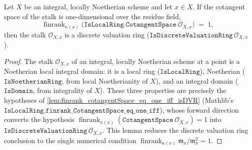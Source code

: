 \begin{lemma}

  \label{lem:isDVR_stalk_of_finrank_cotangentSpace}
  Let \(X\) be an integral, locally Noetherian scheme and let \(x \in X\).
  If the cotangent space of the stalk is one-dimensional over the residue
  field,
  \[
    \operatorname{finrank}_{\kappa(x)}
      \bigl(\texttt{IsLocalRing.CotangentSpace}\ \mathcal O_{X, x}\bigr)
    \;=\; 1,
  \]
  then the stalk \(\mathcal O_{X, x}\) is a discrete valuation ring
  (\(\texttt{IsDiscreteValuationRing}\,\mathcal O_{X, x}\)).
\end{lemma}

\begin{proof}
  \leanok
  The stalk \(\mathcal O_{X, x}\) of an integral, locally Noetherian scheme
  at a point is a Noetherian local integral domain: it is a local ring
  (\(\texttt{IsLocalRing}\)), Noetherian (\(\texttt{IsNoetherianRing}\), from
  local Noetherianity of \(X\)), and an integral domain
  (\(\texttt{IsDomain}\), from integrality of \(X\)). These three properties
  are precisely the hypotheses of \cref{lem:finrank_cotangentSpace_eq_one_iff_isDVR}
  (Mathlib's \(\texttt{IsLocalRing.finrank\_CotangentSpace\_eq\_one\_iff}\)),
  whose forward direction converts the hypothesis
  \(\operatorname{finrank}_{\kappa(x)}
  (\texttt{CotangentSpace}\ \mathcal O_{X, x}) = 1\) into
  \(\texttt{IsDiscreteValuationRing}\,\mathcal O_{X, x}\). This lemma reduces
  the discrete valuation ring conclusion to the single numerical condition
  \(\operatorname{finrank}_{\kappa(x)} \mathfrak m_x/\mathfrak m_x^2 = 1\).
\end{proof}

